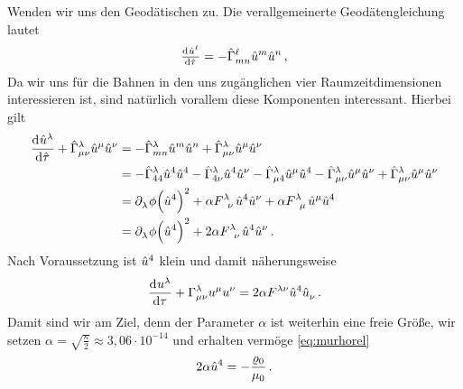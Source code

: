 Wenden wir uns den Geodätischen zu. Die verallgemeinerte Geodätengleichung
lautet
\begin{equation}
\od{\tensor{\hat{u}}{^\ell}}{\hat{\tau}}=-\tensor*{\hat{\Gamma}}{^\ell_m_n}\tensor{\hat{u}}{^m}\tensor{\hat{u}}{^n}
\, ,
\end{equation}
Da wir uns für die Bahnen in den uns zugänglichen vier Raumzeitdimensionen
interessieren ist, sind natürlich vorallem diese Komponenten interessant.
Hierbei gilt
\begin{equation}
\begin{split}
\dod{\tensor{\hat{u}}{^\lambda}}{\hat{\tau}}
+\tensor*{\hat{\Gamma}}{^\lambda_\mu_\nu}\tensor{\hat{u}}{^\mu}\tensor{\hat{u}}{^\nu}
&=
-\tensor*{\hat{\Gamma}}{^\lambda_m_n}\tensor{\hat{u}}{^m}\tensor{\hat{u}}{^n}
+\tensor*{\hat{\Gamma}}{^\lambda_\mu_\nu}\tensor{\hat{u}}{^\mu}\tensor{\hat{u}}{^\nu}\\
&=
-\tensor*{\hat{\Gamma}}{^\lambda_4_4}\tensor{\hat{u}}{^4}\tensor{\hat{u}}{^4}
-\tensor*{\hat{\Gamma}}{^\lambda_4_\nu}\tensor{\hat{u}}{^4}\tensor{\hat{u}}{^\nu}
-\tensor*{\hat{\Gamma}}{^\lambda_\mu_4}\tensor{\hat{u}}{^\mu}\tensor{\hat{u}}{^4}
-\tensor*{\hat{\Gamma}}{^\lambda_\mu_\nu}\tensor{\hat{u}}{^\mu}\tensor{\hat{u}}{^\nu}
+\tensor*{\hat{\Gamma}}{^\lambda_\mu_\nu}\tensor{\hat{u}}{^\mu}\tensor{\hat{u}}{^\nu}
\\
&=
\tensor{\partial}{_\lambda}\phi\left(\tensor{\hat{u}}{^4}\right)^2
+\alpha\tensor{F}{^\lambda_\nu}\tensor{\hat{u}}{^4}\tensor{\hat{u}}{^\nu}
+\alpha\tensor{F}{^\lambda_\mu}\tensor{\hat{u}}{^\mu}\tensor{\hat{u}}{^4}\\
&=
\tensor{\partial}{_\lambda}\phi\left(\tensor{\hat{u}}{^4}\right)^2
+2\alpha\tensor{F}{^\lambda_\nu}\tensor{\hat{u}}{^4}\tensor{\hat{u}}{^\nu}\,.
\end{split}
\end{equation}
Nach Voraussetzung ist $\tensor{\hat{u}}{^4}$ klein und damit
näherungsweise
\begin{equation}
\dod{\tensor{u}{^\lambda}}{\tau}
+\tensor*{\Gamma}{^\lambda_\mu_\nu}\tensor{u}{^\mu}\tensor{u}{^\nu}
=2\alpha\tensor{F}{^\lambda^\nu}\tensor{\hat{u}}{^4}\tensor{\hat{u}}{_\nu}\,.
\label{eq:KaluzaGeo}
\end{equation}
Damit sind wir am Ziel, denn der Parameter $\alpha$ ist weiterhin eine
freie Größe, wir setzen 
 $\alpha=\sqrt{\frac{\kappa}{2}}\approx 3,06\cdot 10^{-14}$ und
erhalten vermöge \eqref{eq:murhorel}
\begin{equation}
2\alpha\tensor{\hat{u}}{^4}=-
\frac{\varrho_0}{\mu_0}\,.
\end{equation}
